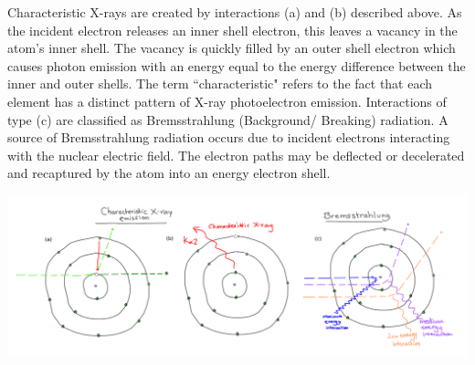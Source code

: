 \documentclass[10pt, a4paper, singlespacing]{report}
\newenvironment{Figure}
    {\par\medskip\noindent\minipage{\linewidth}}
    {\endminipage\par\medskip}
\begin{document}
Characteristic X-rays are created by interactions (a) and (b) described above. As the incident electron releases an inner shell electron, this leaves a vacancy in the atom's inner shell. The vacancy is quickly filled by an outer shell electron which causes photon emission with an energy equal to the energy difference between the inner and outer shells. The term ``characteristic" refers to the fact that each element has a distinct pattern of X-ray photoelectron emission.
Interactions of type (c) are classified as Bremsstrahlung (Background/ Breaking) radiation. A source of Bremsstrahlung radiation occurs due to incident electrons interacting with the nuclear electric field. The electron paths may be deflected or decelerated and recaptured by the atom into an energy electron shell. 
\begin{Figure}
\centering
\includegraphics[width=\linewidth]{characteristic_Bremsstrahlung.pdf}
\label{fig:1.3}
\end{Figure}
\end{document}

